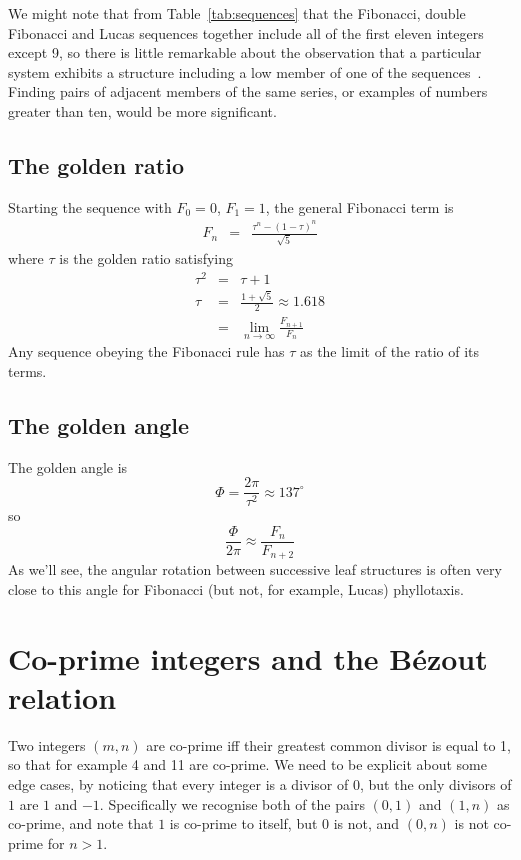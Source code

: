 We might note that from Table~\ref{tab:sequences} that the Fibonacci, double Fibonacci and Lucas sequences together include all  of the first eleven integers except 9, so there is little remarkable about the observation that a particular system exhibits a structure including a low member of one of the sequences~\cite{cookeFibonacciNumbersReveal2006}. Finding pairs of adjacent members of the same series, or examples of numbers greater than ten, would be more significant.

\subsection{The golden ratio}
Starting the sequence with $F_0=0$, $F_1=1$, the general Fibonacci term is 
\begin{eqnarray}
F_n &=& \frac{\tau^n - (1-\tau)^n}{\sqrt{5}}
\end{eqnarray}
where $\tau$ is the golden ratio%
satisfying
\begin{eqnarray}
\tau^2 &=& \tau+1
\\
\tau &=& \frac{1+\sqrt{5}}{2} \approx 1.618
\\
&=& \lim_{n\rightarrow\infty} \frac{F_{n+1}}{F_n} 
\end{eqnarray}
Any sequence obeying the Fibonacci rule has $\tau$  as the limit of the ratio of its terms.

\subsection{The golden angle}
The golden angle is
\[
\Phi = \frac{2\pi}{\tau^2}  \approx 137^\circ
\]
so
\[
\frac{\Phi}{2 \pi} \approx \frac{F_{n}}{F_{n+2}}
\]
As we'll see, the angular rotation between successive leaf structures is often very close to this angle for Fibonacci (but not, for example, Lucas) phyllotaxis.




\section{Co-prime integers and the B\'ezout relation}

\label{sec:coprime}
Two integers $(m,n)$ are co-prime iff their greatest common divisor is equal to 1, so that for example 4 and 11 are co-prime. We need to be explicit about some edge cases, by noticing that every integer is a divisor of $0$, but the only divisors of $1$ are $1$ and $-1$. Specifically we recognise both of the pairs $(0,1)$ and $(1,n)$ as co-prime, and note that $1$ is co-prime to itself, but $0$ is not, and $(0,n)$ is not co-prime for $n>1$.%

